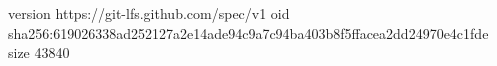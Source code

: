 version https://git-lfs.github.com/spec/v1
oid sha256:619026338ad252127a2e14ade94c9a7c94ba403b8f5ffacea2dd24970e4c1fde
size 43840
